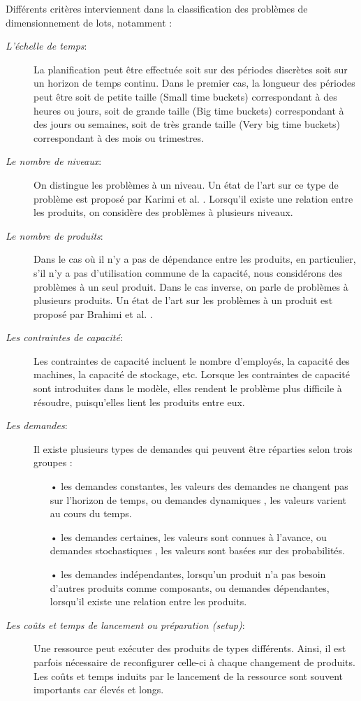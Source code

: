 Différents critères interviennent dans la classification des problèmes de dimensionnement de lots, notamment : 
\begin{description}
	\item[\textsl{L'échelle de temps}:] La planification peut être effectuée soit sur des périodes discrètes soit sur un horizon de temps continu. Dans le premier cas, la longueur des périodes peut être soit de petite taille (Small time buckets) correspondant à des heures ou jours, soit de grande taille (Big time buckets) correspondant à des jours ou semaines, soit de très grande taille (Very big time buckets) correspondant à des mois ou trimestres.

	\item[\textsl{Le nombre de niveaux}:] On distingue les problèmes à un niveau. Un état de l'art sur ce type de problème est proposé par Karimi et al. \cite{karimi} . Lorsqu'il existe une relation entre les produits, on considère des problèmes à plusieurs niveaux.

	\item[\textsl{Le nombre de produits}:] Dans le cas où il n'y a pas de dépendance entre les produits, en particulier, s'il n'y a pas d'utilisation commune de la capacité, nous considérons des problèmes à un seul produit. Dans le cas inverse, on parle de problèmes à plusieurs produits. Un état de l'art sur les problèmes à un produit est proposé par Brahimi et al. \cite{brahimi}.

	\item[\textsl{Les contraintes de capacité}:] Les contraintes de capacité incluent le nombre d'employés, la capacité des machines, la capacité de stockage, etc. Lorsque les contraintes de capacité sont
introduites dans le modèle, elles rendent le problème plus difficile à résoudre,
puisqu'elles lient les produits entre eux.

	\item[\textsl{Les demandes}:] Il existe plusieurs types de demandes qui peuvent être réparties selon trois
groupes :
	\begin{itemize}
		\item[•] les demandes constantes, les valeurs des demandes ne changent pas sur l'horizon de temps, ou demandes dynamiques , les valeurs varient au cours du temps.
		\item[•] les demandes certaines, les valeurs sont connues à l'avance, ou demandes stochastiques , les valeurs sont basées sur des probabilités.
		\item[•] les demandes indépendantes, lorsqu'un produit n'a pas besoin d'autres produits comme composants, ou demandes dépendantes, lorsqu'il existe une relation entre les produits.
	\end{itemize}

	\item[\textsl{Les coûts et temps de lancement ou préparation (setup)}:] Une ressource peut exécuter des produits de types différents. Ainsi, il est parfois nécessaire de reconfigurer celle-ci à chaque changement de produits. Les coûts et temps induits par le lancement de la ressource sont souvent importants car
élevés et longs.
	
\end{description}

